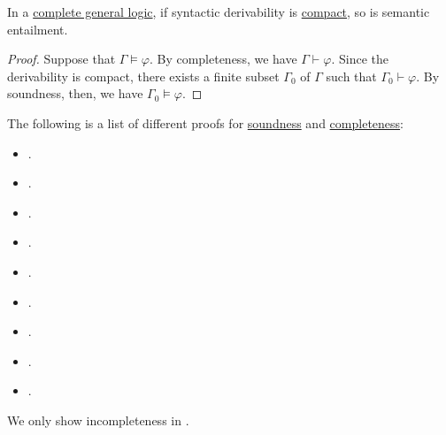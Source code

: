 \begin{proposition}\label{thm:completeness_implies_compactness}
  In a \hyperref[def:general_logic/completeness]{complete general logic}, if syntactic derivability is \hyperref[def:consequence_relation/compactness]{compact}, so is semantic entailment.
\end{proposition}
\begin{proof}
  Suppose that \( \Gamma \vDash \varphi \). By completeness, we have \( \Gamma \vdash \varphi \). Since the derivability is compact, there exists a finite subset \( \Gamma_0 \) of \( \Gamma \) such that \( \Gamma_0 \vdash \varphi \). By soundness, then, we have \( \Gamma_0 \vDash \varphi \).
\end{proof}

\begin{remark}\label{rem:soundness_and_completeness_theorem_list}
  The following is a list of different proofs for \hyperref[def:general_logic]{soundness} and \hyperref[def:general_logic/completeness]{completeness}:
  \begin{itemize}
    \item {}.
    \item {}.
    \item {}.
    \item {}.
    \item {}.
    \item {}.
    \item {}.
    \item {}.
    \item {}.
  \end{itemize}
\end{remark}
\begin{comments}
  \item We only show incompleteness in .
\end{comments}

